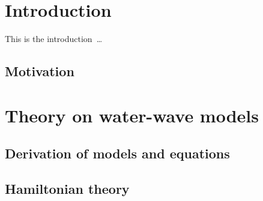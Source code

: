\chapter{Introduction}
This is the introduction~\cite{deb01, pyprop, Dinvay2017}\ldots



\section{Motivation}


\chapter{Theory on water-wave models}



\section{Derivation of models and equations}






\section{Hamiltonian theory}





